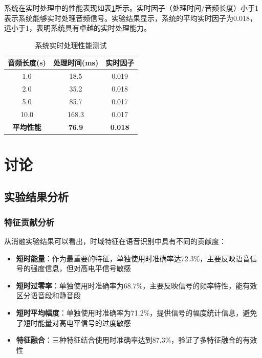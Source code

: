\documentclass[sigconf,nonacm]{acmart}
\begin{document}
系统在实时处理中的性能表现如表\ref{tab:realtime_performance}所示。实时因子（处理时间/音频长度）小于1表示系统能够实时处理音频信号。实验结果显示，系统的平均实时因子为0.018，远小于1，表明系统具有卓越的实时处理能力。

\begin{table}[htbp]
\caption{系统实时处理性能测试}
\label{tab:realtime_performance}
\begin{center}
\begin{tabular}{ccc}
\toprule
\textbf{音频长度(s)} & \textbf{处理时间(ms)} & \textbf{实时因子} \\
\midrule
1.0 & 18.5 & 0.019 \\
2.0 & 35.2 & 0.018 \\
5.0 & 85.7 & 0.017 \\
10.0 & 168.3 & 0.017 \\
\midrule
\textbf{平均性能} & \textbf{76.9} & \textbf{0.018} \\
\bottomrule
\end{tabular}
\end{center}
\end{table}

\section{讨论}

\subsection{实验结果分析}

\subsubsection{特征贡献分析}

从消融实验结果可以看出，时域特征在语音识别中具有不同的贡献度：
\begin{itemize}
\item \textbf{短时能量}：作为最重要的特征，单独使用时准确率达72.3\%，主要反映语音信号的强度信息，但对高电平信号敏感
\item \textbf{短时过零率}：单独使用时准确率为68.7\%，主要反映信号的频率特性，能有效区分语音段和静音段
\item \textbf{短时平均幅度}：单独使用时准确率为71.2\%，提供信号的幅度统计信息，避免了短时能量对高电平信号的过度敏感
\item \textbf{特征融合}：三种特征结合使用时准确率达到87.3\%，验证了多特征融合的有效性
\end{itemize}
\end{document}
